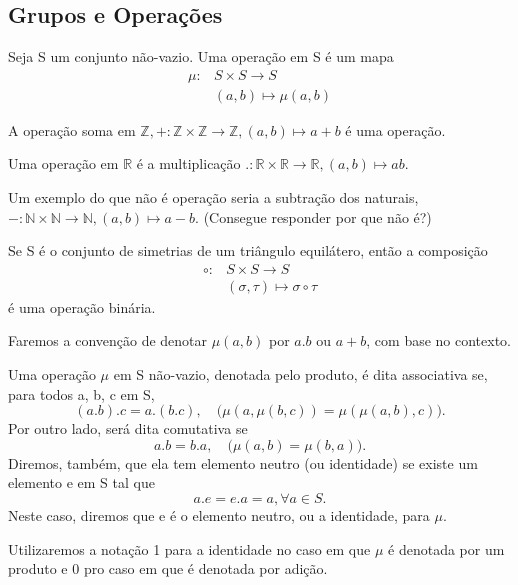 \documentclass[algebra_notes.tex]{subfiles}
\begin{document}
\subsection{Grupos e Operações}
\begin{def*}
	Seja S um conjunto não-vazio. Uma operação em S é um mapa
	\begin{align*}
		\mu: & S \times S\rightarrow S  \\
		     & (a, b)\mapsto{\mu(a, b)}
	\end{align*}
\end{def*}
\begin{example*}
	A operação soma em $\mathbb{Z}, +:\mathbb{Z}\times{\mathbb{Z}}\rightarrow \mathbb{Z}, (a, b)\mapsto a + b$ é uma operação.
\end{example*}
\begin{example*}
	Uma operação em $\mathbb{R}$ é a multiplicação $.:\mathbb{R}\times{\mathbb{R}}\rightarrow \mathbb{R}, (a, b)\mapsto ab.$
\end{example*}
\begin{example*}
	Um exemplo do que não é operação seria a subtração dos naturais, $-:\mathbb{N}\times{\mathbb{N}}\rightarrow \mathbb{N}, (a, b)\mapsto a - b.$ (Consegue responder por que não é?)
\end{example*}
\begin{example*}
	Se S é o conjunto de simetrias de um triângulo equilátero, então a composição
	\begin{align*}
		\circ: & S\times{S}\rightarrow S                \\
		       & (\sigma, \tau)\mapsto \sigma\circ \tau
	\end{align*}
	é uma operação binária.
\end{example*}
Faremos a convenção de denotar $\mu(a, b)$ por $a.b$ ou $a + b$, com base no contexto.
\begin{def*}
	Uma operação $\mu$ em S não-vazio, denotada pelo produto, é dita associativa se, para todos a, b, c em S,
	$$
		(a.b).c = a.(b.c), \quad \biggl(\mu(a, \mu(b, c)) = \mu(\mu(a, b), c)\biggr).
	$$
	Por outro lado, será dita comutativa se
	$$
		a.b = b.a, \quad \biggl(\mu(a, b) = \mu(b, a)\biggr).
	$$
	Diremos, também, que ela tem elemento neutro (ou identidade) se existe um elemento e em S tal que
	$$
		a.e = e.a = a,\forall a\in{S}.
	$$
	Neste caso, diremos que e é o elemento neutro, ou a identidade, para $\mu$.
\end{def*}
Utilizaremos a notação 1 para a identidade no caso em que $\mu$ é denotada por um produto e 0 pro caso em que é denotada por adição.
\end{document}
